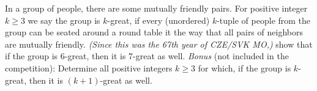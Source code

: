 In a group of people, there are some mutually friendly pairs. For positive integer $k\ge3$ we say the group is $k$-great, if every (unordered) $k$-tuple of people from the group can be seated around a round table it the way that all pairs of neighbors are mutually friendly. \textit{(Since this was the 67th year of CZE/SVK MO,)} show that if the group is 6-great, then it is 7-great as well.
\textit{Bonus} (not included in the competition): Determine all positive integers $k\ge3$ for which, if the group is $k$-great, then it is  $(k+1)$-great as well.
